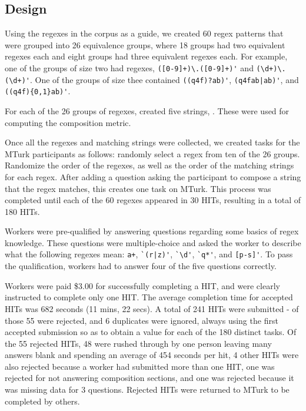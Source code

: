 \subsection{Design}
Using the regexes in the corpus as a guide, we created 60 regex patterns that were grouped into 26 equivalence groups, where 18 groups had two equivalent regexes each and eight groups had three equivalent regexes each. For example, one of the groups of size two had regexes, \verb!([0-9]+)\.([0-9]+)'! and \verb!(\d+)\.(\d+)'!. One of the groups of size thee contained \verb!((q4f)?ab)'!, \verb!(q4fab|ab)'!, and \verb!((q4f){0,1}ab)'!.

For each of the 26 groups of regexes, created five strings, . These were used for computing the composition metric.

Once all the regexes and matching strings were collected, we created tasks for the MTurk participants as follows: randomly select a regex from ten of the 26 groups. Randomize the order of the regexes, as well as the order of the matching strings for each regex. After adding a question asking the participant to compose a string that the regex matches, this creates one task on MTurk. This process was completed until each of the 60 regexes appeared in 30 HITs, resulting in a total of 180 HITs.

Workers were pre-qualified by answering questions regarding some basics of regex knowledge. These questions were multiple-choice and asked the worker to describe what the following regexes mean: \verb!a+!, \verb!`(r|z)'!, \verb!`\d'!, \verb!`q*'!, and \verb![p-s]'!. To pass the qualification, workers had to answer four of the five questions correctly.

Workers were paid \$3.00 for successfully completing a HIT, and were clearly instructed to complete only one HIT.  The average completion time for accepted HITs was 682 seconds (11 mins, 22 secs).  A total of 241 HITs were submitted - of those 55 were rejected, and 6 duplicates were ignored, always using the first accepted submission so as to obtain a value for each of the 180 distinct tasks.
Of the 55 rejected HITs, 48 were rushed through by one person leaving many answers blank and spending an average of 454 seconds per hit, 4 other HITs were also rejected because a worker had submitted more than one HIT, one was rejected for not answering composition sections, and one was rejected because it was missing data for 3 questions.  Rejected HITs were returned to MTurk to be completed by others.

